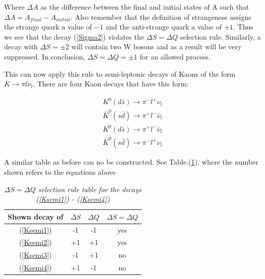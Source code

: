 \noindent Where $\Delta A$ as the difference between the final and initial states of A such that $\Delta A = A_{final} - A_{initial}$. Also remember that the definition of strangeness assigns the strange quark a value of $-1$ and the anti-strange quark a value of $+1$. Thus we see that the decay (\ref{Sigma2}) violates the $\Delta S = \Delta Q$ selection rule. Similarly, a decay with $\Delta S = \pm 2$ will contain two W bosons and as a result will be very suppressed. In conclusion, $\Delta S = \Delta Q = \pm 1$ for an allowed process.      

This can now apply this rule to semi-leptonic decays of Kaons of the form $K \rightarrow \pi l \nu_{l}$. There are four Kaon decays that have this form:

\begin{align} %
\label{Ksemi1}
K^{0} (d \bar{s}) \rightarrow \pi^{-} l^{+} \nu_{l} \\
\label{Ksemi2}
\bar{K}^{0} (s \bar{d}) \rightarrow \pi^{+} l^{-} \bar{\nu}_{l} \\
\label{Ksemi3}
K^{0} (d \bar{s}) \rightarrow \pi^{+} l^{-} \bar{\nu}_{l} \\
\label{Ksemi4}
\bar{K}^{0} (s \bar{d}) \rightarrow \pi^{-} l^{+} \nu_{l} 
\end{align} 

\noindent A similar table as before can no be constructed. See Table.(\ref{DeltaSQruleKsemi}), where the number shown refers to the equations above

\begin{table}[h!]
\caption{\textit{$\Delta S = \Delta Q$ selection rule table for the decays (\ref{Ksemi1}) - (\ref{Ksemi4})}}
\centering
\setlength{\tabcolsep}{10pt}
\begin{tabular}{c| ccc}
\hline
Shown decay of  & $\Delta S$ & $\Delta Q$ & $\Delta S = \Delta Q$ \\ 
\hline \hline
(\ref{Ksemi1})  &     -1     &     -1     & yes                   \\
(\ref{Ksemi2})  &     +1     &     +1     & yes                   \\
(\ref{Ksemi3})  &     -1     &     +1     & no                    \\
(\ref{Ksemi4})  &     +1     &     -1     & no                    \\
\hline
\end{tabular} 
\label{DeltaSQruleKsemi}
\end{table}

